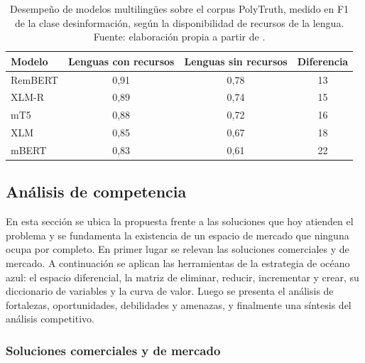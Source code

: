 \begin{table}[t]
  \centering
  \caption{Desempeño de modelos multilingües sobre el corpus PolyTruth, medido en F1 de la clase desinformación, según la disponibilidad de recursos de la lengua. Fuente: elaboración propia a partir de \textcite{GoulievEtAl2025}.}
  \label{tab:polytruth}
  \begin{tabular}{l c c c}
    \hline
    \textbf{Modelo} & \textbf{Lenguas con recursos} & \textbf{Lenguas sin recursos} & \textbf{Diferencia} \\
    \hline
    RemBERT   & 0,91 & 0,78 & 13 \\
    XLM-R     & 0,89 & 0,74 & 15 \\
    mT5       & 0,88 & 0,72 & 16 \\
    XLM       & 0,85 & 0,67 & 18 \\
    mBERT     & 0,83 & 0,61 & 22 \\
    \hline
  \end{tabular}
\end{table}

\subsection{Análisis de competencia}
\label{sec:competencia}

En esta sección se ubica la propuesta frente a las soluciones que hoy atienden el problema y se fundamenta la existencia de un espacio de mercado que ninguna ocupa por completo. En primer lugar se relevan las soluciones comerciales y de mercado. A continuación se aplican las herramientas de la estrategia de océano azul: el espacio diferencial, la matriz de eliminar, reducir, incrementar y crear, su diccionario de variables y la curva de valor. Luego se presenta el análisis de fortalezas, oportunidades, debilidades y amenazas, y finalmente una síntesis del análisis competitivo.

\subsubsection{Soluciones comerciales y de mercado}
\label{sec:soluciones-mercado}

